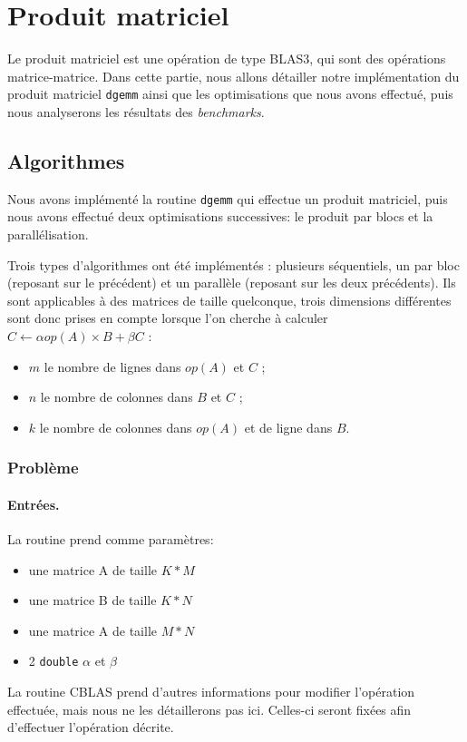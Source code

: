 \section{Produit matriciel}

Le produit matriciel est une opération de type BLAS3, qui sont des opérations matrice-matrice. Dans cette partie, nous allons détailler notre implémentation du produit matriciel \texttt{dgemm} ainsi que les optimisations que nous avons effectué, puis nous analyserons les résultats des \emph{benchmarks}.

\subsection{Algorithmes}

Nous avons implémenté la routine \texttt{dgemm} qui effectue un produit matriciel, puis nous avons effectué deux optimisations successives: le produit par blocs et la parallélisation.

Trois types d'algorithmes ont été implémentés : plusieurs séquentiels, un par bloc (reposant sur le précédent) et un parallèle (reposant sur les deux précédents). Ils sont applicables à des matrices de taille quelconque, trois dimensions différentes sont donc prises en compte lorsque l'on cherche à calculer $C \leftarrow \alpha op(A) \times B + \beta C$ :
\begin{itemize}
\item $m$ le nombre de lignes dans $op(A)$  et $C$ ;
\item $n$ le nombre de colonnes dans $B$ et $C$ ;
\item $k$ le nombre de colonnes dans $op(A)$ et de ligne dans $B$.
\end{itemize}


\subsubsection{Problème}

\paragraph{Entrées.} La routine prend comme paramètres:
\begin{itemize}
\item une matrice A de taille $K*M$
\item une matrice B de taille $K*N$
\item une matrice A de taille $M*N$
\item 2 \texttt{double} $\alpha$ et $\beta$
\end{itemize}
La routine CBLAS prend d'autres informations pour modifier l'opération effectuée, mais nous ne les détaillerons pas ici. Celles-ci seront fixées afin d'effectuer l'opération décrite.

